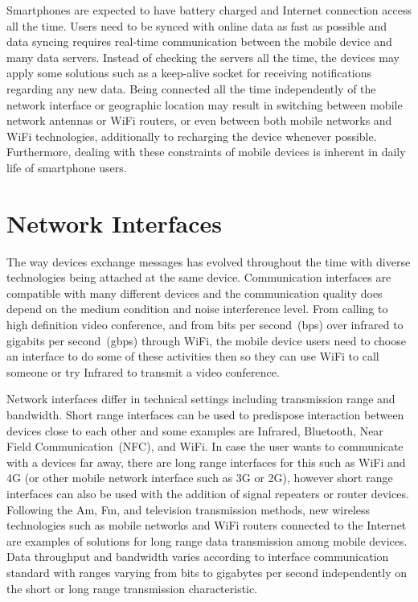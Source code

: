 Smartphones are expected to have battery charged and Internet connection access all the time.
Users need to be synced with online data as fast as possible and data syncing requires real-time communication between the mobile device and many data servers.
Instead of checking the servers all the time, the devices may apply some solutions such as a keep-alive socket for receiving notifications regarding any new data.
Being connected all the time independently of the network interface or geographic location may result in switching between mobile network antennas or WiFi routers, or even between both mobile networks and WiFi technologies, additionally to recharging the device whenever possible.
Furthermore, dealing with these constraints of mobile devices is inherent in daily life of smartphone users. %



\section{Network Interfaces}
\label{sec:networkinterfaces}

The way devices exchange messages has evolved throughout the time with diverse technologies being attached at the same device.
Communication interfaces are compatible with many different devices and the communication quality does depend on the medium condition and noise interference level.
From calling to high definition video conference, and from bits per second~(bps) over infrared to gigabits per second~(gbps) through WiFi, the mobile device users need to choose an interface to do some of these activities then so they can use WiFi to call someone or try Infrared to transmit a video conference.

Network interfaces differ in technical settings including transmission range and bandwidth.
Short range interfaces can be used to predispose interaction between devices close to each other and some examples are Infrared, Bluetooth, Near Field Communication~(NFC), and WiFi.
In case the user wants to communicate with a devices far away, there are long range interfaces for this such as WiFi and 4G (or other mobile network interface such as 3G or 2G), however short range interfaces can also be used with the addition of signal repeaters or router devices.
Following the Am, Fm, and television transmission methods, new wireless technologies such as mobile networks and WiFi routers connected to the Internet are examples of solutions for long range data transmission among mobile devices.
Data throughput and bandwidth varies according to interface communication standard with ranges varying from bits to gigabytes per second independently on the short or long range transmission characteristic.

